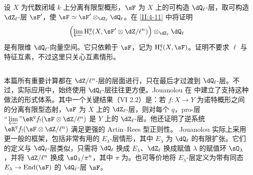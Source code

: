 \subsection{}\label{II:2-10}
设 $X$ 为代数闭域 $k$ 上分离有限型概形，$\sF$ 为 $X$ 上的可构造 $\dQ_\ell$-层，取可构造 $\dZ_\ell$-层 $\sF'$，使 $\sF\simeq\sF'\otimes_{\dZ_\ell}\dQ_\ell$。在 \ref{II:4-11} 中将证明
\[\left(\varprojlim\h_c^q(X,\sF'\otimes\dZ/\ell^n)\right)\otimes_{\dZ_\ell}\dQ_\ell\]
是有限维 $\dQ_\ell$-向量空间。它只依赖于 $\sF$，记为 $\h_c^q(X,\sF)$。证明不要求 $\ell$ 与特征互素，不过这里只关心互素情形。

\subsection{}\label{II:2-11}
本篇所有重要计算都在 $\dZ/\ell^n$-层的层面进行，只在最后才过渡到 $\dQ_\ell$-层。不过，实际应用中，始终使用 $\dQ_\ell$-层往往更方便。Jouanolou 在 \cite[V、VI]{sga5} 中建立了支持这种做法的形式体系。其中一个关键结果（VI 2.2）是：若 $f:X\to Y$ 为诺特概形之间的分离有限型态射，$\sF$ 为 $X$ 上的 $\dZ_\ell$-层，则对每个 $q$，pro-层 $\text{``}\varprojlim\text{''}\eR^qf_!(\sF\otimes\dZ/\ell^n)$ 是 $Y$ 上的 $\dZ_\ell$-层。他还证明了逆系统 $\eR^qf_!(\sF\otimes\dZ/\ell^n)$ 满足更强的 Artin--Rees 型正则性。
Jouanolou 实际上采用更一般的框架，包括非常有用的 $E_\lambda$-层情形，其中 $E_\lambda$ 为 $\dQ_\ell$ 的有限扩张。它们的定义与 $\dQ_\ell$-层类似，只需将 $\dQ_\ell$ 换成 $E_\lambda$、$\dZ_\ell$ 换成赋值 $\lambda$ 的赋值环 $\sO_\lambda$，并将 $\dZ/\ell^n$ 换成 $\sO_\lambda/\pi^n$，其中 $\pi$ 为。也可等价地将 $E_\lambda$-层定义为带有同态 $E_\lambda\to\operatorname{End}(\sF)$ 的 $\dQ_\ell$-层 $\sF$。

